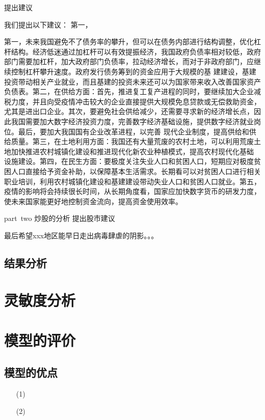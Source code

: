 \documentclass{whutmod}
\begin{document}
  		提出建议
  		
  		我们提出以下建议：
  		第一，
  		
  		第一，未来我国避免不了债务率的攀升，但可以在债务内部进行结构调整，优化杠杆结构。经济低迷通过加杠杆可以有效提振经济，我国政府负债率相对较低，政府部门需要加杠杆，加大政府部门负债率，拉动经济增长，而对于非政府部门，应继续控制杠杆攀升速度。政府发行债务筹到的资金应用于大规模的基 建建设，基建投资带动相关产业就业，而且基建的投资未来还可以为国家带来收入改善国家资产负债表。第二，在供给方面：首先，推进复工复产进程的同时，要继续加大企业减税力度，并且向受疫情冲击较大的企业直接提供大规模免息贷款或无偿救助资金，尤其是进出口企业。其次，要避免社会供给减少，还需要寻求新的经济增长点，因此我国需要加大数字经济投资力度，完善数字经济基础设施，提供数字经济就业岗位。最后，要加大我国国有企业改革进程，以完善 现代企业制度，提高供给和供给质量。第三，在土地利用方面：我国还有大量荒废的农村土地，可以利用荒废土地加快推进农村城镇化建设和推进现代化新农业种植模式，提高农村现代化基础 设施建设。第四，在民生方面：要极度关注失业人口和贫困人口，短期应对极度贫困人口直接给予资金补助，以保障基本生活需求。长期看可以对贫困人口进行相关职业培训，利用农村城镇化建设和基建建设带动失业人口和贫困人口就业。第五，疫情的影响将会持续很长时间，从长期角度看，国家应加快数字货币的研发力度，使未来国家能更好地控制资金流向，提高资金使用效率。
  		
  		part\ two
  		炒股的分析
  		提出股市建议
  		
  		最后希望xxx地区能早日走出病毒肆虐的阴影。。。
  		\subsection{结果分析}
  
  	\section{灵敏度分析}
 
  	\section{模型的评价}
		\subsection{模型的优点}
			\begin{itemize}                                             
			\item [(1)]
			\item [(2)] 	
			\end{itemize}
\end{document}
